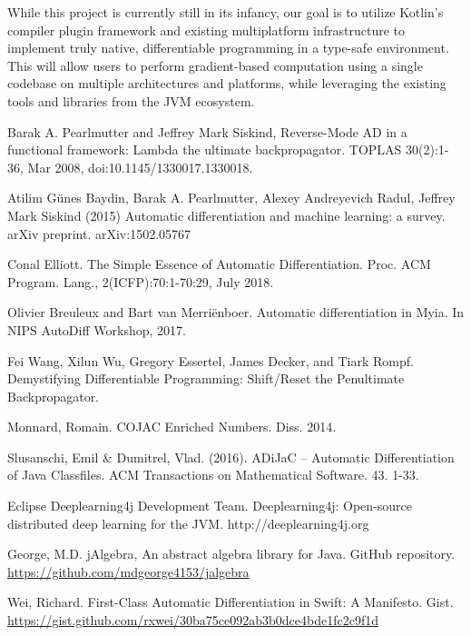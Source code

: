 While this project is currently still in its infancy, our goal is to utilize Kotlin's compiler plugin framework and existing multiplatform infrastructure to implement truly native, differentiable programming in a type-safe environment. This will allow users to perform gradient-based computation using a single codebase on multiple architectures and platforms, while leveraging the existing tools and libraries from the JVM ecosystem.



\begin{thebibliography}{99}

 Barak A. Pearlmutter and Jeffrey Mark Siskind, Reverse-Mode AD in a functional framework: Lambda the ultimate backpropagator. TOPLAS 30(2):1-36, Mar 2008, doi:10.1145/1330017.1330018.

 Atilim G{\"{u}}nes Baydin, Barak A. Pearlmutter, Alexey Andreyevich Radul, Jeffrey Mark Siskind (2015) Automatic differentiation and machine learning: a survey. arXiv preprint. arXiv:1502.05767

 Conal Elliott. The Simple Essence of Automatic Differentiation. Proc. ACM Program. Lang., 2(ICFP):70:1-70:29, July 2018.

 Olivier Breuleux and Bart van Merri\"enboer.  Automatic differentiation in Myia. In NIPS AutoDiff Workshop, 2017.

 Fei Wang, Xilun Wu, Gregory  Essertel, James Decker, and Tiark Rompf. Demystifying Differentiable Programming:  Shift/Reset the Penultimate Backpropagator.

 Monnard, Romain. COJAC Enriched Numbers. Diss. 2014.

 Slusanschi, Emil \& Dumitrel, Vlad. (2016). ADiJaC -- Automatic Differentiation of Java Classfiles. ACM Transactions on Mathematical Software. 43. 1-33.

 Eclipse Deeplearning4j Development Team. Deeplearning4j: Open-source distributed deep learning for the JVM. http://deeplearning4j.org

  George, M.D. jAlgebra, An abstract algebra library for Java. GitHub repository. \url{https://github.com/mdgeorge4153/jalgebra}

  Wei, Richard. First-Class Automatic Differentiation in Swift: A Manifesto. Gist. \url{https://gist.github.com/rxwei/30ba75ce092ab3b0dce4bde1fc2c9f1d}

\end{thebibliography}